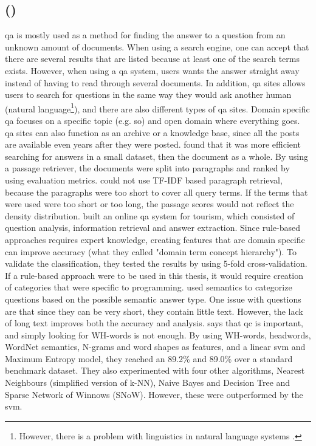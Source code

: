 \subsection[Question-Answering]{ ()}
\label{sec:question_answering}
\gls{qa} is mostly used as a method for finding the answer to a question from an unknown amount of documents.
When using a search engine, one can accept that there are several results that are listed because at least one of the search terms exists. 
However, when using a \gls{qa} system, users wants the answer straight away instead of having to read through several documents. 
In addition, \gls{qa} sites allows users to search for questions in the same way they would ask another human (natural language\footnote{
	However, there is a problem with linguistics in natural language systems \cite{Lopez2011}.
	}), 
and there are also different types of \gls{qa} sites.
Domain specific \gls{qa} focuses on a specific topic (e.g. \gls{so}) and open domain where everything goes. 
\gls{qa} sites can also function as an archive or a knowledge base, since all the posts are available even years after they were posted.
\vspace{0.5em}\newline
\textcite{Yen2013} found that it was more efficient searching for answers in a small dataset, then the document as a whole. 
By using a passage retriever, the documents were split into paragraphs and ranked by using evaluation metrics. 
\textcite{Isozaki2005} could not use TF-IDF based paragraph retrieval, because the paragraphs were too short to cover all query terms. 
If the terms that were used were too short or too long, the passage scores would not reflect the density distribution. 
\textcite{Xu2012} built an online \gls{qa} system for tourism, which consisted of question analysis, information retrieval and answer extraction.
Since rule-based approaches requires expert knowledge, creating features that are domain specific can improve accuracy (what they called "domain term concept hierarchy").
To validate the classification, they tested the results by using 5-fold cross-validation.
If a rule-based approach were to be used in this thesis, it would require creation of categories that were specific to programming.
\vspace{0.5em}\newline
\textcite{Li} used semantics to categorize questions based on the possible semantic answer type. 
One issue with questions are that since they can be very short, they contain little text. 
However, the lack of long text improves both the accuracy and analysis. 
\vspace{0.5em}\newline
\textcite{Zhang2003} says that \gls{qc} is important, and simply looking for WH-words is not enough. 
By using WH-words, headwords, WordNet semantics, N-grams and word shapes as features, and a linear \gls{svm} and Maximum Entropy model, 
they reached an 89.2\% and 89.0\% over a standard benchmark dataset. 
They also experimented with four other algorithms, Nearest Neighbours (simplified version of k-NN),  Naive Bayes and Decision Tree and Sparse Network of Winnows (SNoW).
However, these were outperformed by the \gls{svm}.


